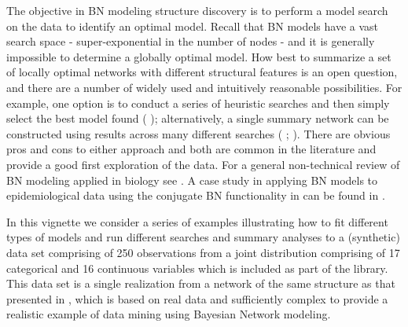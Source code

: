 \documentclass[nojss]{jss}
\begin{document}
The objective in BN modeling structure discovery is to perform a model search on the data to identify an optimal model. Recall that BN models have a vast search space - super-exponential in the number of nodes - and it is generally impossible to determine a globally optimal model. How best to summarize a set of locally optimal networks with different structural features is an open question, and there are a number of widely used and intuitively reasonable possibilities. For example, one option is to conduct a series of heuristic searches and then simply select the best model found (\citeauthor{HECKERMAN1995} \citeyear{HECKERMAN1995}); alternatively, a single summary network can be constructed using results across many different searches (\citeauthor{Hodges2010} \citeyear{Hodges2010}; \citeauthor{Poon2007} \citeyear{Poon2007}). There are obvious pros and cons to either approach and both are common in the literature and provide a good first exploration of the data. For a general non-technical review of BN modeling applied in biology see \citeauthor{Needham2007} \citeyear{Needham2007}. A case study in applying BN models to epidemiological data using the conjugate BN functionality in  can be found in \citeauthor{Lewis2011b} \citeyear{Lewis2011b}.

In this vignette we consider a series of examples illustrating how to fit different types of models and run different searches and summary analyses to a (synthetic) data set comprising of 250 observations from a joint distribution comprising of 17 categorical and 16 continuous variables which is included as part of the  library. This data set is a single realization from a network of the same structure as that presented in \citeauthor{Lewis2011b} \citeyear{Lewis2011b}, which is based on real data and sufficiently complex to provide a realistic example of data mining using Bayesian Network modeling. 
 
\end{document}
